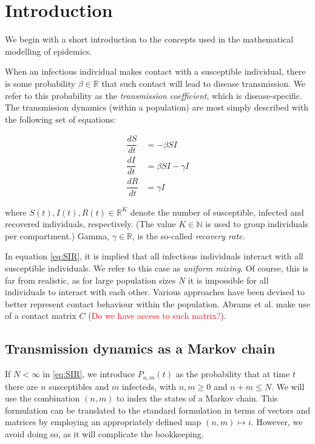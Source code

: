 \documentclass[a4paper]{article}
\theoremstyle{remark}
\begin{document}
   
    
\section{Introduction}

We begin with a short introduction to the concepts used in the mathematical modelling of epidemics. 

When an infectious individual makes contact with a susceptible individual, there is some probability $\beta \in \mathbb{R}$ that such contact will lead to disease transmission. We refer to this probability as the \textit{transmission coefficient}, which is disease-specific. The transmission dynamics (within a population) are most simply described with the following set of equations:

\begin{equation} 
\label{eq:SIR}
\begin{split}
\dfrac{dS}{dt} &=  -\beta SI \\
 \dfrac{dI}{dt} &=  \beta SI - \gamma I \\
 \dfrac{dR}{dt} &=  \gamma I\end{split}
\end{equation}

\noindent
where $S(t),I(t),R(t) \in \mathbb{R}^K$ denote the number of susceptible, infected and recovered individuals, respectively. (The value $K \in \mathbb{N}$ is used to group individuals per {\color{red} compartment}.) Gamma, $\gamma \in \mathbb{R}$, is the so-called \textit{recovery rate}. %

In equation \eqref{eq:SIR}, it is implied that all infectious individuals interact with all susceptible individuals. We refer to this case as \textit{uniform mixing}. Of course, this is far from realistic, as for large population sizes $N$ it is impossible for all individuals to interact with each other. Various approaches have been devised to better represent contact behaviour within the population. Abrams et al. make use of a contact matrix $C$ (\textcolor{red}{Do we have access to such matrix?}).

\subsection{Transmission dynamics as a Markov chain}


If $N<\infty$ in \eqref{eq:SIR}, we introduce $P_{n,m}(t)$ as the probability that at time $t$ there are $n$ susceptibles and $m$ infecteds, with $n,m\geq 0$ and $n+m\leq N$. We will use the combination $(n,m)$ to index the states of a Markov chain. This formulation can be translated to the standard formulation in terms of vectors and matrices by employing an appropriately defined map $(n,m)\mapsto i$. However, we avoid doing so, as it will complicate the bookkeeping.
\end{document}
